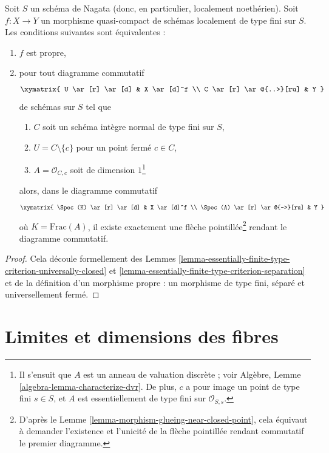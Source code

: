 \begin{lemma}
\label{lemma-essentially-finite-type-criterion-proper}
Soit $S$ un schéma de Nagata (donc, en particulier, localement noethérien).
Soit $f : X \to Y$ un morphisme quasi-compact de schémas localement
de type fini sur $S$. Les conditions suivantes sont équivalentes :
\begin{enumerate}
\item $f$ est propre,
\item pour tout diagramme commutatif
$$
\xymatrix{
U \ar[r] \ar[d] & X \ar[d]^f \\
C \ar[r] \ar@{..>}[ru] & Y
}
$$
de schémas sur $S$ tel que
\begin{enumerate}
\item $C$ soit un schéma intègre normal de type fini sur $S$,
\item $U = C \setminus \{c\}$ pour un point fermé $c \in C$,
\item $A = \mathcal{O}_{C, c}$ soit de dimension $1$\footnote{Il s'ensuit
que $A$ est un anneau de valuation discrète ; voir
Algèbre, Lemme \ref{algebra-lemma-characterize-dvr}.
De plus, $c$ a pour image un point de type fini $s \in S$, et
$A$ est essentiellement de type fini sur $\mathcal{O}_{S, s}$.}
\end{enumerate}
alors, dans le diagramme commutatif
$$
\xymatrix{
\Spec(K) \ar[r] \ar[d] & X \ar[d]^f \\
\Spec(A) \ar[r] \ar@{-->}[ru] & Y
}
$$
où $K = \text{Frac}(A)$, il existe exactement une flèche pointillée\footnote{D'après le
Lemme \ref{lemma-morphism-glueing-near-closed-point}, cela
équivaut à demander l'existence et l'unicité de la flèche pointillée
rendant commutatif le premier diagramme.}
rendant le diagramme commutatif.
\end{enumerate}
\end{lemma}

\begin{proof}
Cela découle formellement des Lemmes
\ref{lemma-essentially-finite-type-criterion-universally-closed} et
\ref{lemma-essentially-finite-type-criterion-separation}
et de la définition d'un morphisme propre : un morphisme de type fini, séparé
et universellement fermé.
\end{proof}






\section{Limites et dimensions des fibres}
\label{section-limits-dimension}

